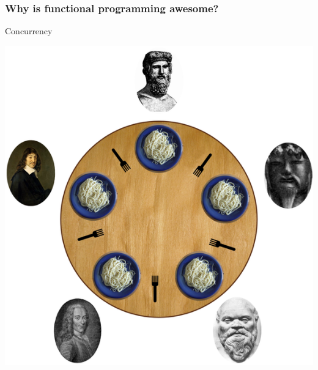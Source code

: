 \documentclass[12pt, xcolor=table]{beamer}
\begin{document}
\begin{frame}
    \frametitle{Why is functional programming awesome?}
    \begin{block}{Concurrency}
        \begin{center}
            \includegraphics[scale=0.3]{figures/DiningPhilosophers.png}
        \end{center}
    \end{block}
\end{frame}
\end{document}
